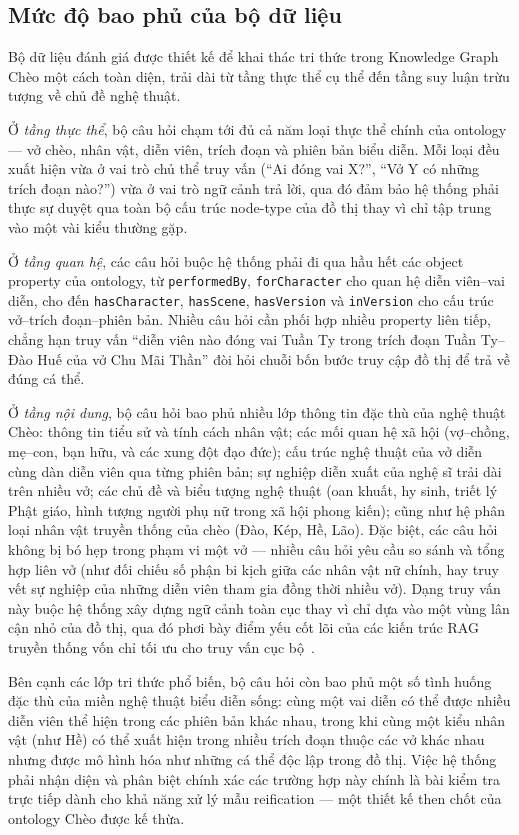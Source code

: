 \subsection{Mức độ bao phủ của bộ dữ liệu}

Bộ dữ liệu đánh giá được thiết kế để khai thác tri thức trong Knowledge Graph Chèo một cách toàn diện, trải dài từ tầng thực thể cụ thể đến tầng suy luận trừu tượng về chủ đề nghệ thuật.

Ở \textit{tầng thực thể}, bộ câu hỏi chạm tới đủ cả năm loại thực thể chính của ontology --- vở chèo, nhân vật, diễn viên, trích đoạn và phiên bản biểu diễn. Mỗi loại đều xuất hiện vừa ở vai trò chủ thể truy vấn (``Ai đóng vai X?'', ``Vở Y có những trích đoạn nào?'') vừa ở vai trò ngữ cảnh trả lời, qua đó đảm bảo hệ thống phải thực sự duyệt qua toàn bộ cấu trúc node-type của đồ thị thay vì chỉ tập trung vào một vài kiểu thường gặp. 

Ở \textit{tầng quan hệ}, các câu hỏi buộc hệ thống phải đi qua hầu hết các object property của ontology, từ \texttt{performedBy}, \texttt{forCharacter} cho quan hệ diễn viên--vai diễn, cho đến \texttt{hasCharacter}, \texttt{hasScene}, \texttt{hasVersion} và \texttt{inVersion} cho cấu trúc vở--trích đoạn--phiên bản. Nhiều câu hỏi cần phối hợp nhiều property liên tiếp, chẳng hạn truy vấn ``diễn viên nào đóng vai Tuần Ty trong trích đoạn Tuần Ty--Đào Huế của vở Chu Mãi Thần'' đòi hỏi chuỗi bốn bước truy cập đồ thị để trả về đúng cá thể.

Ở \textit{tầng nội dung}, bộ câu hỏi bao phủ nhiều lớp thông tin đặc thù của nghệ thuật Chèo: thông tin tiểu sử và tính cách nhân vật; các mối quan hệ xã hội (vợ--chồng, mẹ--con, bạn hữu, và các xung đột đạo đức); cấu trúc nghệ thuật của vở diễn cùng dàn diễn viên qua từng phiên bản; sự nghiệp diễn xuất của nghệ sĩ trải dài trên nhiều vở; các chủ đề và biểu tượng nghệ thuật (oan khuất, hy sinh, triết lý Phật giáo, hình tượng người phụ nữ trong xã hội phong kiến); cũng như hệ phân loại nhân vật truyền thống của chèo (Đào, Kép, Hề, Lão). Đặc biệt, các câu hỏi không bị bó hẹp trong phạm vi một vở --- nhiều câu hỏi yêu cầu so sánh và tổng hợp liên vở (như đối chiếu số phận bi kịch giữa các nhân vật nữ chính, hay truy vết sự nghiệp của những diễn viên tham gia đồng thời nhiều vở). Dạng truy vấn này buộc hệ thống xây dựng ngữ cảnh toàn cục thay vì chỉ dựa vào một vùng lân cận nhỏ của đồ thị, qua đó phơi bày điểm yếu cốt lõi của các kiến trúc RAG truyền thống vốn chỉ tối ưu cho truy vấn cục bộ~\cite{edge2024graphrag}.

Bên cạnh các lớp tri thức phổ biến, bộ câu hỏi còn bao phủ một số tình huống đặc thù của miền nghệ thuật biểu diễn sống: cùng một vai diễn có thể được nhiều diễn viên thể hiện trong các phiên bản khác nhau, trong khi cùng một kiểu nhân vật (như Hề) có thể xuất hiện trong nhiều trích đoạn thuộc các vở khác nhau nhưng được mô hình hóa như những cá thể độc lập trong đồ thị. Việc hệ thống phải nhận diện và phân biệt chính xác các trường hợp này chính là bài kiểm tra trực tiếp dành cho khả năng xử lý mẫu reification --- một thiết kế then chốt của ontology Chèo được kế thừa.


